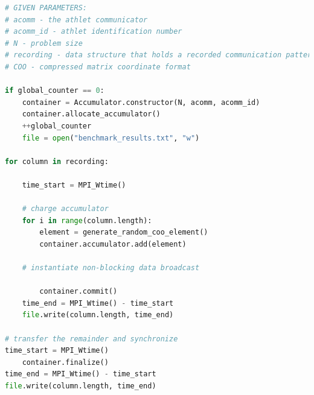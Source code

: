 \begin{minipage}{\linewidth}
\begin{lstlisting}[language=python, caption={Pseudocode of a modified client side of the benchmark}, frame=single, label={lst:beanch:pseudocode}]
# GIVEN PARAMETERS:
# acomm - the athlet communicator
# acomm_id - athlet identification number 
# N - problem size
# recording - data structure that holds a recorded communication pattern
# COO - compressed matrix coordinate format

if global_counter == 0:
	container = Accumulator.constructor(N, acomm, acomm_id)
	container.allocate_accumulator()
	++global_counter
	file = open("benchmark_results.txt", "w")

for column in recording:

	time_start = MPI_Wtime()
	
	# charge accumulator
	for i in range(column.length):
		element = generate_random_coo_element()		
		container.accumulator.add(element)

	# instantiate non-blocking data broadcast
	
		container.commit()
	time_end = MPI_Wtime() - time_start
	file.write(column.length, time_end)
	
# transfer the remainder and synchronize
time_start = MPI_Wtime()
	container.finalize()
time_end = MPI_Wtime() - time_start
file.write(column.length, time_end)


\end{lstlisting}
\end{minipage}


